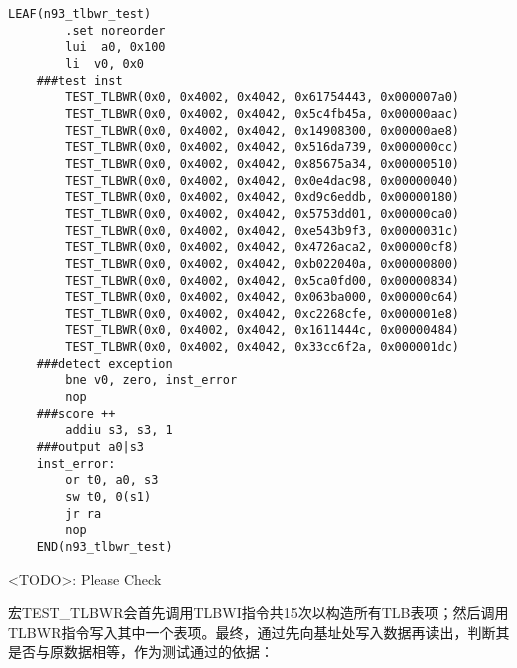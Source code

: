 \begin{enumerate}
    \begin{lstlisting}[caption={n93\_tlbwr.S}, emph={TEST\_TLBWR}]
    LEAF(n93_tlbwr_test)
        .set noreorder
        lui  a0, 0x100
        li  v0, 0x0
    ###test inst
        TEST_TLBWR(0x0, 0x4002, 0x4042, 0x61754443, 0x000007a0)
        TEST_TLBWR(0x0, 0x4002, 0x4042, 0x5c4fb45a, 0x00000aac)
        TEST_TLBWR(0x0, 0x4002, 0x4042, 0x14908300, 0x00000ae8)
        TEST_TLBWR(0x0, 0x4002, 0x4042, 0x516da739, 0x000000cc)
        TEST_TLBWR(0x0, 0x4002, 0x4042, 0x85675a34, 0x00000510)
        TEST_TLBWR(0x0, 0x4002, 0x4042, 0x0e4dac98, 0x00000040)
        TEST_TLBWR(0x0, 0x4002, 0x4042, 0xd9c6eddb, 0x00000180)
        TEST_TLBWR(0x0, 0x4002, 0x4042, 0x5753dd01, 0x00000ca0)
        TEST_TLBWR(0x0, 0x4002, 0x4042, 0xe543b9f3, 0x0000031c)
        TEST_TLBWR(0x0, 0x4002, 0x4042, 0x4726aca2, 0x00000cf8)
        TEST_TLBWR(0x0, 0x4002, 0x4042, 0xb022040a, 0x00000800)
        TEST_TLBWR(0x0, 0x4002, 0x4042, 0x5ca0fd00, 0x00000834)
        TEST_TLBWR(0x0, 0x4002, 0x4042, 0x063ba000, 0x00000c64)
        TEST_TLBWR(0x0, 0x4002, 0x4042, 0xc2268cfe, 0x000001e8)
        TEST_TLBWR(0x0, 0x4002, 0x4042, 0x1611444c, 0x00000484)
        TEST_TLBWR(0x0, 0x4002, 0x4042, 0x33cc6f2a, 0x000001dc)
    ###detect exception
        bne v0, zero, inst_error
        nop
    ###score ++
        addiu s3, s3, 1
    ###output a0|s3
    inst_error:
        or t0, a0, s3
        sw t0, 0(s1)
        jr ra
        nop
    END(n93_tlbwr_test)
    \end{lstlisting}

    <TODO>: Please Check

    宏TEST\_TLBWR会首先调用TLBWI指令共15次以构造所有TLB表项；然后调用TLBWR指令写入其中一个表项。最终，通过先向基址处写入数据再读出，判断其是否与原数据相等，作为测试通过的依据：


\end{enumerate}
